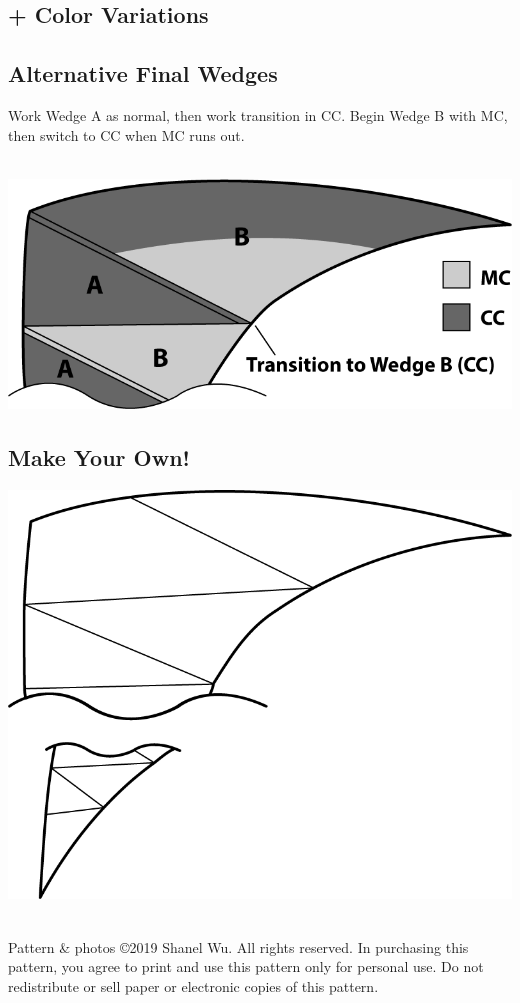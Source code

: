 \documentclass[12pt]{article}
\newenvironment{frnote}
    {%
    	\def\FrameCommand{\fboxrule=\FrameRule\fboxsep=\FrameSep \fcolorbox{framecolor}{shadecolor}}
    	\MakeFramed {\advance\hsize-\width\FrameRestore}}
    {\endMakeFramed}
\begin{document}
\begin{multicols}{2}
\section*{+ Color Variations}

\subsection*{Alternative Final Wedges}

Work Wedge A as normal, then work transition in CC. Begin Wedge B with MC, then switch to CC when MC runs out.

~\\
\includegraphics[width=\linewidth]{pics_BW/schematic_sample2_BW}

\subsection*{Make Your Own!}
\includegraphics[width=\linewidth]{schematic_template}


\vfill ~\\


\begin{frnote} \ssmall
Pattern \& photos \copyright  2019 Shanel Wu.
All rights reserved. In purchasing this pattern, you agree to print and use this pattern only for personal use. Do not redistribute or sell paper or electronic copies of this pattern.
\end{frnote}

\end{multicols}
\end{document}
